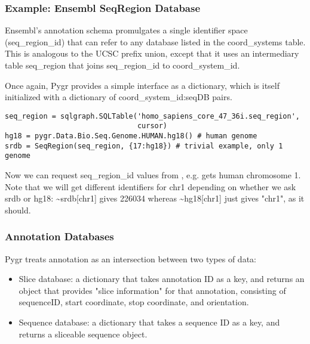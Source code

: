 \documentclass{howto}
\begin{document}
\subsubsection{Example: Ensembl SeqRegion Database}
Ensembl's annotation schema promulgates a single identifier space
(seq_region_id) that can refer to any database listed in the 
coord_systems table.  This is analogous to the UCSC prefix union,
except that it uses an intermediary table seq_region that joins
seq_region_id to coord_system_id.  

Once again, Pygr provides a simple interface as a dictionary, which
is itself initialized with a dictionary of {coord_system_id:seqDB}
pairs.
\begin{verbatim}
seq_region = sqlgraph.SQLTable('homo_sapiens_core_47_36i.seq_region',
                               cursor) 
hg18 = pygr.Data.Bio.Seq.Genome.HUMAN.hg18() # human genome
srdb = SeqRegion(seq_region, {17:hg18}) # trivial example, only 1 genome
\end{verbatim}
Now we can request seq_region_id values from , e.g. 
 gets human chromosome 1.
Note that we will get different identifiers for chr1 depending on whether
we ask srdb or hg18: \textasciitilde srdb[chr1] gives 226034 whereas
\textasciitilde hg18[chr1] just gives "chr1", as it should.


\subsubsection{Annotation Databases}
Pygr treats annotation as an intersection between two types of data:
\begin{itemize}
\item Slice database: a dictionary that takes annotation ID as a key,
and returns an object that provides "slice information" for that annotation,
consisting of sequenceID, start coordinate, stop coordinate, and orientation.

\item Sequence database: a dictionary that takes a sequence ID as a key,
and returns a sliceable sequence object.
\end{itemize}
\end{document}
